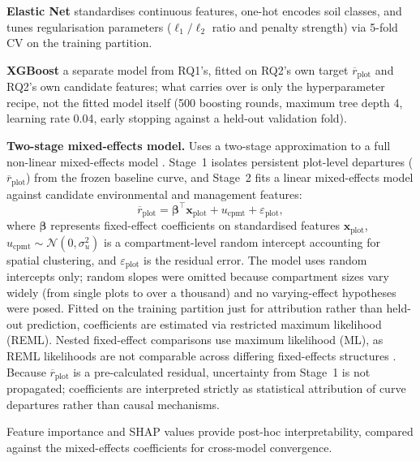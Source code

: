 \begin{enumerate*}[label=(\roman*)]
\item \textbf{Elastic Net} standardises continuous features, one-hot encodes soil classes, and tunes regularisation parameters ($\ell_1/\ell_2$ ratio and penalty strength) via 5-fold CV on the training partition.
\item \textbf{XGBoost} a separate model from RQ1's, fitted on RQ2's own target
  $\overline{r}_{\text{plot}}$ and RQ2's own candidate features;
  what carries over is only the hyperparameter recipe, not the fitted model itself (500 boosting
  rounds, maximum tree depth 4, learning rate 0.04, early stopping against a held-out validation fold).
\item \textbf{Two-stage mixed-effects model.} Uses a two-stage approximation to a full non-linear mixed-effects model \citep{socha2016Assessment_C2_CR}. Stage~1 isolates persistent plot-level departures ($\overline{r}_{\text{plot}}$) from the frozen baseline curve, and Stage~2 fits a linear mixed-effects model against candidate environmental and management features:
\begin{equation}
\overline{r}_{\text{plot}} = \boldsymbol{\beta}^{\top}\mathbf{x}_{\text{plot}} + u_{\text{cpmt}} + \varepsilon_{\text{plot}},
\label{eq:mixed-effects}
\end{equation}
where $\boldsymbol{\beta}$ represents fixed-effect coefficients on standardised features $\mathbf{x}_{\text{plot}}$, $u_{\text{cpmt}} \sim \mathcal{N}(0, \sigma_u^2)$ is a compartment-level random intercept accounting for spatial clustering, and $\varepsilon_{\text{plot}}$ is the residual error. The model uses random intercepts only; random slopes were omitted because compartment sizes vary widely (from single plots to over a thousand) and no varying-effect hypotheses were posed. Fitted on the training partition just for attribution rather than held-out prediction, coefficients are estimated via restricted maximum likelihood (REML). Nested fixed-effect comparisons use maximum likelihood (ML), as REML likelihoods are not comparable across differing fixed-effects structures \citep{pinheiro2000Mixed_C5_EVAL}. Because $\overline{r}_{\text{plot}}$ is a pre-calculated residual, uncertainty from Stage~1 is not propagated; coefficients are interpreted strictly as statistical attribution of curve departures rather than causal mechanisms.
\end{enumerate*}

Feature importance and SHAP values provide post-hoc interpretability, compared against the mixed-effects coefficients for cross-model convergence. %

